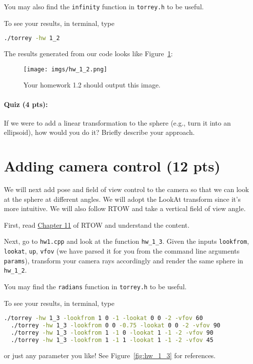 You may also find the \lstinline{infinity} function in \lstinline{torrey.h} to be useful.

To see your results, in terminal, type
\begin{lstlisting}[language=bash]
  ./torrey -hw 1_2
\end{lstlisting}

The results generated from our code looks like Figure~\ref{fig:hw_1_2}:
\begin{figure}[ht]
    \centering
    \texttt{[image: imgs/hw\_1\_2.png]}
    \caption{Your homework 1.2 should output this image.}
    \label{fig:hw_1_2}
\end{figure}

\paragraph{Quiz (4 pts):} If we were to add a linear transformation to the sphere (e.g., turn it into an ellipsoid), how would you do it? Briefly describe your approach.

\section{Adding camera control (12 pts)}
We will next add pose and field of view control to the camera so that we can look at the sphere at different angles. We will adopt the LookAt transform since it's more intuitive. We will also follow RTOW and take a vertical field of view angle.

First, read \href{https://raytracing.github.io/books/RayTracingInOneWeekend.html#positionablecamera}{Chapter 11} of RTOW and understand the content.

Next, go to \lstinline{hw1.cpp} and look at the function \lstinline{hw_1_3}. Given the inputs \lstinline{lookfrom}, \lstinline{lookat}, \lstinline{up}, \lstinline{vfov} (we have parsed it for you from the command line arguments \lstinline{params}), transform your camera rays accordingly and render the same sphere in \lstinline{hw_1_2}.

You may find the \lstinline{radians} function in \lstinline{torrey.h} to be useful.

To see your results, in terminal, type
\begin{lstlisting}[language=bash]
  ./torrey -hw 1_3 -lookfrom 1 0 -1 -lookat 0 0 -2 -vfov 60
  ./torrey -hw 1_3 -lookfrom 0 0 -0.75 -lookat 0 0 -2 -vfov 90
  ./torrey -hw 1_3 -lookfrom 1 -1 0 -lookat 1 -1 -2 -vfov 90
  ./torrey -hw 1_3 -lookfrom 1 -1 1 -lookat 1 -1 -2 -vfov 45
\end{lstlisting}
or just any parameter you like! See Figure~\ref{fig:hw_1_3} for references.

